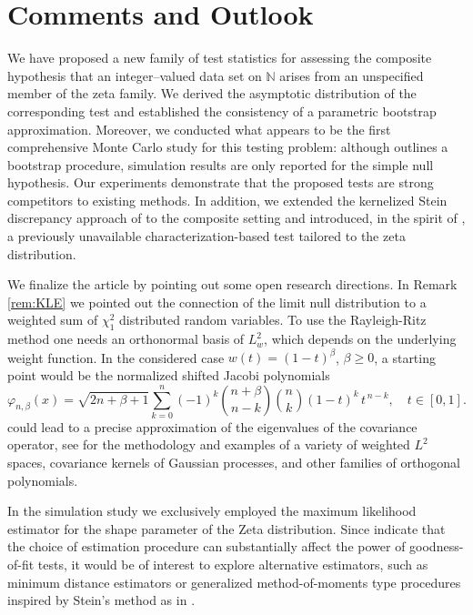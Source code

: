\documentclass{article}
\theoremstyle{thm}
\theoremstyle{def}
\newcommand{\N}{\mathbb{N}} %
\begin{document}
\section{Comments and Outlook}\label{sec:out}
We have proposed a new family of test statistics for assessing the composite hypothesis that an integer–valued data set on $\N$ arises from an unspecified member of the zeta family. We derived the asymptotic distribution of the corresponding test and established the consistency of a parametric bootstrap approximation. Moreover, we conducted what appears to be the first comprehensive Monte Carlo study for this testing problem: although \cite{M:2009} outlines a bootstrap procedure, simulation results are only reported for the simple null hypothesis. Our experiments demonstrate that the proposed tests are strong competitors to existing methods. In addition, we extended the kernelized Stein discrepancy approach of \cite{Yang:2018} to the composite setting and introduced, in the spirit of \cite{BEN:2022}, a previously unavailable characterization-based test tailored to the zeta distribution.

We finalize the article by pointing out some open research directions. In Remark \ref{rem:KLE} we pointed out the connection of the limit null distribution to a weighted sum of $\chi^2_1$ distributed random variables. To use the Rayleigh-Ritz method one needs an orthonormal basis of $L^2_w$, which depends on the underlying weight function. In the considered case $w(t)=(1-t)^\beta$, $\beta\ge0$, a starting point would be the normalized shifted Jacobi polynomials
\begin{equation*}
    \varphi_{n,\beta}(x)=\sqrt{2n+\beta+1}\sum_{k=0}^n (-1)^k \binom{n+\beta}{n-k}\binom{n}{k}(1-t)^k\, t^{\,n-k}, \quad t \in[0,1].
\end{equation*}
could lead to a precise approximation of the eigenvalues of the covariance operator, see \cite{EJM:2025} for the methodology and examples of a variety of weighted $L^2$ spaces, covariance kernels of Gaussian processes, and other families of orthogonal polynomials.

In the simulation study we exclusively employed the maximum likelihood estimator for the shape parameter of the Zeta distribution. Since \citet{DKO:1990} indicate that the choice of estimation procedure can substantially affect the power of goodness-of-fit tests, it would be of interest to explore alternative estimators, such as minimum distance estimators or generalized method-of-moments type procedures inspired by Stein’s method as in \citet{BEK:2021,EFGPS:2025}.
\end{document}
